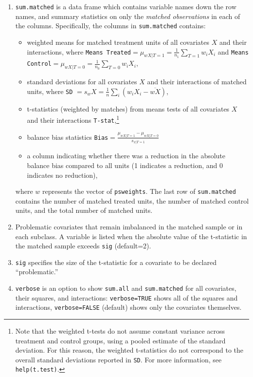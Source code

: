 \documentclass[oneside,letterpaper,titlepage]{article}
\begin{document}
\begin{enumerate}
\item \texttt{sum.matched} is a data frame  
  which contains variable names down the row names, and summary statistics on only
  the  \emph{matched observations} in each of the
  columns.  Specifically, the columns in \texttt{sum.matched} contains:
  \begin{itemize}
  \item weighted means for matched treatment units of all covariates $X$ and their
    interactions, where \texttt{Means Treated}$= \mu_{wX|T=1} =
    \frac{1}{n_1} \sum_{T=1} w_iX_i$ and
    \texttt{Means Control}$=\mu_{wX|T=0} = \frac{1}{n_0} \sum_{T=0} w_iX_i$,
  \item standard deviations for all covariates $X$ and their
    interactions of matched units, where
    \texttt{SD} $= s_wX = \frac{1}{n} \sum_{i} (w_iX_i - \overline{wX})$,
  \item t-statistics (weighted by matches) from means tests of all covariates $X$ and their
    interactions \texttt{T-stat},\footnote{Note that the weighted t-tests do
      not assume constant variance across treatment and control
      groups, using a pooled estimate of the standard deviation.  For
      this reason, the weighted t-statistics do not correspond to the overall standard
      deviations reported in \texttt{SD}.
      For more information, see \texttt{help(t.test)}.}
  \item balance bias statistics
  \texttt{Bias}$=\frac{\mu_{wX|T=1} -
  \mu_{wX|T=0}}{s_{x|T=1}}$
  \item a column indicating whether there was a reduction in the
  absolute balance bias compared to all units (1 indicates a
  reduction, and 0 indicates no reduction),
  \end{itemize}
  
  where $w$ represents the vector of \texttt{psweights}.   The last row
  of \texttt{sum.matched} contains the number of matched treated units, the
  number of matched control units, and the total number of matched units.  

\item Problematic covariates that remain imbalanced in the matched sample or in each subclass.  A variable is listed
when the absolute value of the t-statistic in the matched sample exceeds \texttt{sig} (default=2).  

\item \texttt{sig} specifies the size of the t-statistic for a covariate to be declared ``problematic.''

\item \texttt{verbose} is an option to show \texttt{sum.all} and \texttt{sum.matched} for all covariates, their squares, and interactions: 
\texttt{verbose=TRUE} shows all of the squares and interactions, \texttt{verbose=FALSE} (default) shows only the covariates themselves.


\end{enumerate}
\end{document}
